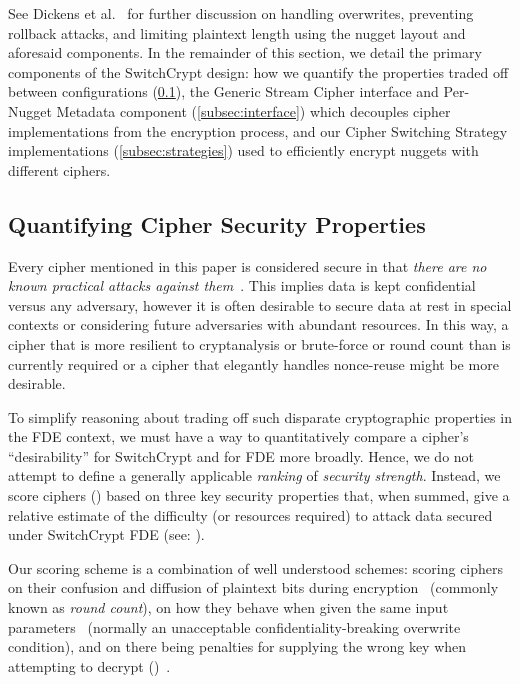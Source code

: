 See Dickens et al.~\cite{StrongBox} for further discussion on handling
overwrites, preventing rollback attacks, and limiting plaintext length using the
nugget layout and aforesaid components. In the remainder of this section, we
detail the primary components of the SwitchCrypt design: how we quantify the
properties traded off between configurations (\cref{subsec:quantify}), the
Generic Stream Cipher interface and Per-Nugget Metadata component
(\cref{subsec:interface}) which decouples cipher implementations from the
encryption process, and our Cipher Switching Strategy implementations
(\cref{subsec:strategies}) used to efficiently encrypt nuggets with different
ciphers.

\subsection{Quantifying Cipher Security Properties} \label{subsec:quantify}

Every cipher mentioned in this paper is considered secure in that \emph{there
are no known practical attacks against them}~\cite{ChaCha20, Freestyle, SalsaX,
Rabbit, Sosemanuk, AESCTR}. This implies data is kept confidential versus any
adversary, however it is often desirable to secure data at rest in special
contexts or considering future adversaries with abundant resources. In this way,
a cipher that is more resilient to cryptanalysis or brute-force or round count
than is currently required or a cipher that elegantly handles nonce-reuse might
be more desirable.

To simplify reasoning about trading off such disparate cryptographic properties
in the FDE context, we must have a way to quantitatively compare a cipher's
``desirability'' for SwitchCrypt and for FDE more broadly. Hence, we do not
attempt to define a generally applicable \textit{ranking} of \emph{security
strength}. Instead, we score ciphers () based
on three key security properties that, when summed, give a relative estimate of
the difficulty (or resources required) to attack data secured under SwitchCrypt
FDE (see: ).

Our scoring scheme is a combination of well understood schemes: scoring ciphers
on their confusion and diffusion of plaintext bits during
encryption~\cite{attack1,attack2,AESItself} (commonly known as \emph{round
count}), on how they behave when given the same input
parameters~\cite{random1,Freestyle,random2} (normally an unacceptable
confidentiality-breaking overwrite condition), and on there being penalties for
supplying the wrong key when attempting to decrypt ()~\cite{Freestyle,Mercy}.

